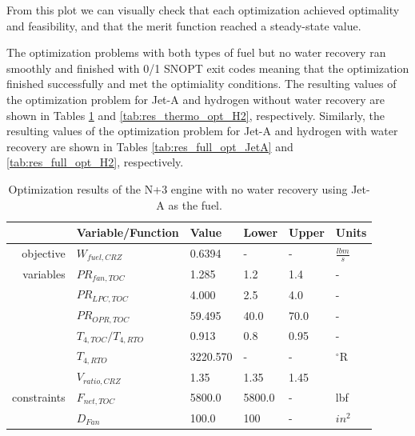 \documentclass[conf]{new-aiaa}
\begin{document}
From this plot we can visually check that each optimization achieved optimality and feasibility, and that the merit function reached a steady-state value.


The optimization problems with both types of fuel but no water recovery ran smoothly and finished with 0/1 SNOPT exit codes meaning that the optimization finished successfully and met the optimiality conditions.
The resulting values of the optimization problem for Jet-A and hydrogen without water recovery are shown in Tables \ref{tab:res_thermo_opt_JetA} and \ref{tab:res_thermo_opt_H2}, respectively.
Similarly, the resulting values of the optimization problem for Jet-A and hydrogen with water recovery are shown in Tables \ref{tab:res_full_opt_JetA} and \ref{tab:res_full_opt_H2}, respectively.

\begin{table}[hbt!]
    \centering
    \caption{Optimization results of the N+3 engine with no water recovery using Jet-A as the fuel.
    }
    \small
    \renewcommand{\arraystretch}{1.2}
    \begin{tabular}{r l l l l l}
                    & Variable/Function     & Value    & Lower  & Upper & Units           \\
        \toprule
        objective   & $W_{fuel,CRZ}$        & 0.6394   & -      & -     & $\frac{lbm}{s}$ \\
        \hline
        variables   & $PR_{fan,TOC}$        & 1.285    & 1.2    & 1.4   & -               \\
                    & $PR_{LPC,TOC}$        & 4.000    & 2.5    & 4.0   & -               \\
                    & $PR_{OPR,TOC}$        & 59.495   & 40.0   & 70.0  & -               \\
                    & $T_{4,TOC}/T_{4,RTO}$ & 0.913    & 0.8    & 0.95  & -               \\
                    & $T_{4,RTO}$           & 3220.570 & -      & -     & $^\circ$R       \\
                    & $V_{ratio,CRZ}$       & 1.35     & 1.35   & 1.45  &                 \\
        \hline
        constraints & $F_{net,TOC}$         & 5800.0   & 5800.0 & -     & lbf             \\
                    & $D_{Fan}$             & 100.0    & 100    & -     & $in^2$          \\
        \bottomrule
    \end{tabular}
    \label{tab:res_thermo_opt_JetA}
\end{table}
\end{document}
